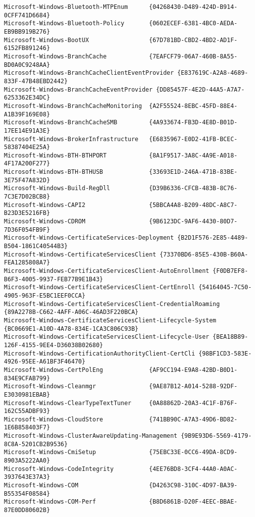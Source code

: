 \documentclass{report}
\begin{document}
\begin{lstlisting}[breaklines=true,basicstyle=\tiny]
Microsoft-Windows-Bluetooth-MTPEnum      {04268430-D489-424D-B914-0CFF741D6684}
Microsoft-Windows-Bluetooth-Policy       {0602ECEF-6381-4BC0-AEDA-EB9BB919B276}
Microsoft-Windows-BootUX                 {67D781BD-CBD2-4BD2-AD1F-6152FB891246}
Microsoft-Windows-BranchCache            {7EAFCF79-06A7-460B-8A55-BD0A0C9248AA}
Microsoft-Windows-BranchCacheClientEventProvider {E837619C-A2A8-4689-833F-47B48EBD2442}
Microsoft-Windows-BranchCacheEventProvider {DD85457F-4E2D-44A5-A7A7-6253362E34DC}
Microsoft-Windows-BranchCacheMonitoring  {A2F55524-8EBC-45FD-88E4-A1B39F169E08}
Microsoft-Windows-BranchCacheSMB         {4A933674-FB3D-4E8D-B01D-17EE14E91A3E}
Microsoft-Windows-BrokerInfrastructure   {E6835967-E0D2-41FB-BCEC-58387404E25A}
Microsoft-Windows-BTH-BTHPORT            {8A1F9517-3A8C-4A9E-A018-4F17A200F277}
Microsoft-Windows-BTH-BTHUSB             {33693E1D-246A-471B-83BE-3E75F47A832D}
Microsoft-Windows-Build-RegDll           {D39B6336-CFCB-483B-8C76-7C3E7D02BCB8}
Microsoft-Windows-CAPI2                  {5BBCA4A8-B209-48DC-A8C7-B23D3E5216FB}
Microsoft-Windows-CDROM                  {9B6123DC-9AF6-4430-80D7-7D36F054FB9F}
Microsoft-Windows-CertificateServices-Deployment {B2D1F576-2E85-4489-B504-1861C40544B3}
Microsoft-Windows-CertificateServicesClient {73370BD6-85E5-430B-B60A-FEA1285808A7}
Microsoft-Windows-CertificateServicesClient-AutoEnrollment {F0DB7EF8-B6F3-4005-9937-FEB77B9E1B43}
Microsoft-Windows-CertificateServicesClient-CertEnroll {54164045-7C50-4905-963F-E5BC1EEF0CCA}
Microsoft-Windows-CertificateServicesClient-CredentialRoaming {89A2278B-C662-4AFF-A06C-46AD3F220BCA}
Microsoft-Windows-CertificateServicesClient-Lifecycle-System {BC0669E1-A10D-4A78-834E-1CA3C806C93B}
Microsoft-Windows-CertificateServicesClient-Lifecycle-User {BEA18B89-126F-4155-9EE4-D36038B02680}
Microsoft-Windows-CertificationAuthorityClient-CertCli {98BF1CD3-583E-4926-95EE-A61BF3F46470}
Microsoft-Windows-CertPolEng             {AF9CC194-E9A8-42BD-B0D1-834E9CFAB799}
Microsoft-Windows-Cleanmgr               {9AE87B12-A014-5288-92DF-E3030981EBAB}
Microsoft-Windows-ClearTypeTextTuner     {0A88862D-20A3-4C1F-B76F-162C55ADBF93}
Microsoft-Windows-CloudStore             {741BB90C-A7A3-49D6-BD82-1E6B858403F7}
Microsoft-Windows-ClusterAwareUpdating-Management {9B9E93D6-5569-4179-8C8A-5201CB2B9536}
Microsoft-Windows-CmiSetup               {75EBC33E-0CC6-49DA-8CD9-8903A5222AA0}
Microsoft-Windows-CodeIntegrity          {4EE76BD8-3CF4-44A0-A0AC-3937643E37A3}
Microsoft-Windows-COM                    {D4263C98-310C-4D97-BA39-B55354F08584}
Microsoft-Windows-COM-Perf               {B8D6861B-D20F-4EEC-BBAE-87E0DD80602B}

\end{lstlisting}
\end{document}
